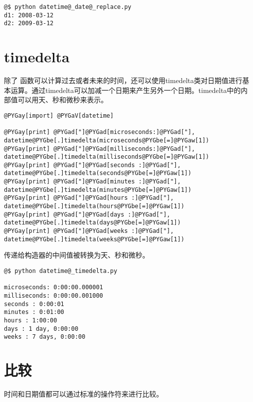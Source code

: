 \documentclass[a4paper,10pt,english]{manual}
\begin{document}
\begin{Verbatim}[commandchars=@\[\]]
@$ python datetime@_date@_replace.py
d1: 2008-03-12
d2: 2009-03-12
\end{Verbatim}


\section{timedelta}

除了  函数可以计算过去或者未来的时间，还可以使用timedelta类对日期值进行基本运算。通过timedelta可以加减一个日期来产生另外一个日期。timedelta中的内部值可以用天、秒和微秒来表示。

\begin{Verbatim}[commandchars=@\[\]]
@PYGay[import] @PYGaV[datetime]

@PYGay[print] @PYGad["]@PYGad[microseconds:]@PYGad["], datetime@PYGbe[.]timedelta(microseconds@PYGbe[=]@PYGaw[1])
@PYGay[print] @PYGad["]@PYGad[milliseconds:]@PYGad["], datetime@PYGbe[.]timedelta(milliseconds@PYGbe[=]@PYGaw[1])
@PYGay[print] @PYGad["]@PYGad[seconds :]@PYGad["], datetime@PYGbe[.]timedelta(seconds@PYGbe[=]@PYGaw[1])
@PYGay[print] @PYGad["]@PYGad[minutes :]@PYGad["], datetime@PYGbe[.]timedelta(minutes@PYGbe[=]@PYGaw[1])
@PYGay[print] @PYGad["]@PYGad[hours :]@PYGad["], datetime@PYGbe[.]timedelta(hours@PYGbe[=]@PYGaw[1])
@PYGay[print] @PYGad["]@PYGad[days :]@PYGad["], datetime@PYGbe[.]timedelta(days@PYGbe[=]@PYGaw[1])
@PYGay[print] @PYGad["]@PYGad[weeks :]@PYGad["], datetime@PYGbe[.]timedelta(weeks@PYGbe[=]@PYGaw[1])
\end{Verbatim}

传递给构造器的中间值被转换为天、秒和微秒。

\begin{Verbatim}[commandchars=@\[\]]
@$ python datetime@_timedelta.py

microseconds: 0:00:00.000001
milliseconds: 0:00:00.001000
seconds : 0:00:01
minutes : 0:01:00
hours : 1:00:00
days : 1 day, 0:00:00
weeks : 7 days, 0:00:00
\end{Verbatim}


\section{比较}

时间和日期值都可以通过标准的操作符来进行比较。
\end{document}
